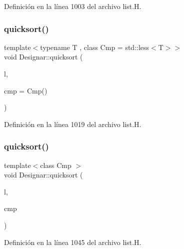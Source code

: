 Definición en la línea 1003 del archivo list.\+H.

\mbox{\label{namespace_designar_a7a2c6974344050666f37a5f9cdf889a4}} 
\subsubsection{\texorpdfstring{quicksort()}{quicksort()}\hspace{0.1cm}{\footnotesize\ttfamily [3/14]}}
{\footnotesize\ttfamily template$<$typename T , class Cmp  = std\+::less$<$\+T$>$$>$ \\
void Designar\+::quicksort (\begin{DoxyParamCaption}\item[{\hyperlink{class_designar_1_1_node_s_l_list}{Node\+S\+L\+List}$<$ T $>$ \&}]{l,  }\item[{Cmp \&\&}]{cmp = {\ttfamily Cmp()} }\end{DoxyParamCaption})\hspace{0.3cm}{\ttfamily [inline]}}



Definición en la línea 1019 del archivo list.\+H.

\mbox{\label{namespace_designar_a8c58e24da6b5bd73a9218ece3ec9f54f}} 
\subsubsection{\texorpdfstring{quicksort()}{quicksort()}\hspace{0.1cm}{\footnotesize\ttfamily [4/14]}}
{\footnotesize\ttfamily template$<$class Cmp $>$ \\
void Designar\+::quicksort (\begin{DoxyParamCaption}\item[{\hyperlink{class_designar_1_1_d_l}{DL} \&}]{l,  }\item[{Cmp \&}]{cmp }\end{DoxyParamCaption})\hspace{0.3cm}{\ttfamily [inline]}}



Definición en la línea 1045 del archivo list.\+H.

\mbox{\label{namespace_designar_abeece6dc0f858ceaf46690f5b26b2512}} 
